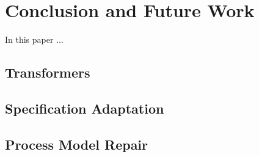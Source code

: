 \section{Conclusion and Future Work}
\label{sec:conclusion}

In this paper ...

\subsection{Transformers}

\subsection{Specification Adaptation}

\subsection{Process Model Repair}

